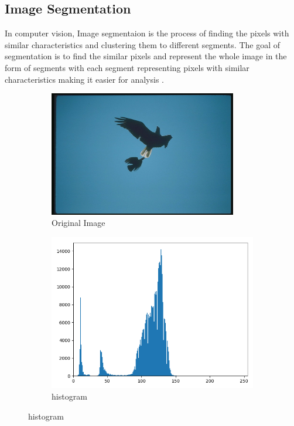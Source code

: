 \documentclass[conference]{IEEEtran}
\begin{document}
\subsection{Image Segmentation}
In computer vision, Image segmentaion is the process of finding the pixels with similar characteristics and clustering them to different segments. The goal of segmentation is to find the similar pixels and represent the whole image in the form of segments with each segment representing pixels with similar characteristics making it easier for analysis \cite{b12}\cite{b13}.
\begin{figure}
    \centering
    \begin{subfigure}{.5\linewidth}
      \centering
      \includegraphics[width=0.9\textwidth]{imgresults/eagle_original.png}
      \caption{Original Image}
      \label{fig:sub1}
    \end{subfigure}%
    \begin{subfigure}{.5\linewidth}
        \centering
        \includegraphics[width=1\textwidth]{imgresults/eagle_hist.png}
        \caption{histogram}
        \label{fig:histogram}
    \end{subfigure}
    \label{fig:sub}



\end{figure}
\end{document}

